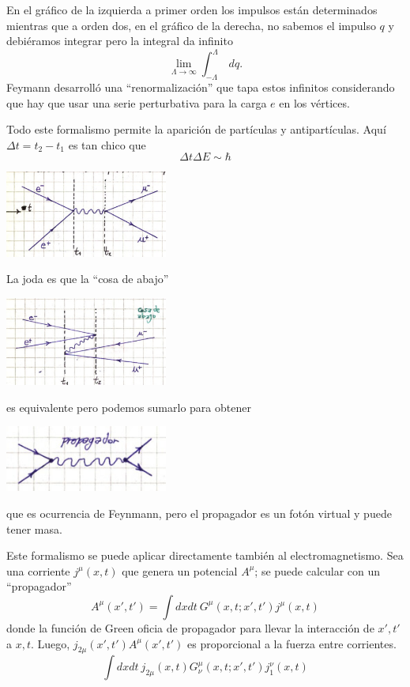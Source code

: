 \documentclass[10pt,oneside]{CBFT_book}
\begin{document}
En el gráfico de la izquierda a primer orden los impulsos están determinados mientras que a orden
dos, en el gráfico de la derecha, no sabemos el impulso $q$ y debiéramos integrar pero la integral
da infinito
\[
	\lim_{\Lambda \to \infty} \int_{-\Lambda}^\Lambda \: dq.
\]
Feymann desarrolló una ``renormalización'' que tapa estos infinitos considerando que hay que usar
una serie perturbativa para la carga $e$ en los vértices.

Todo este formalismo permite la aparición de partículas y antipartículas. Aquí $\Delta t = t_2 - t_1$ es
tan chico que 
\[
	\Delta t \Delta E \sim \hbar
\]

\includegraphics[width=0.4\textwidth]{images/fig_ft2_desdoblamiento_1a.jpg}

La joda es que la ``cosa de abajo'' 

\includegraphics[width=0.4\textwidth]{images/fig_ft2_desdoblamiento_1b.jpg}

es equivalente pero podemos sumarlo para obtener

\includegraphics[width=0.4\textwidth]{images/fig_ft2_desdoblamiento_2a.jpg}

que es ocurrencia de Feynmann, pero el propagador es un fotón virtual y puede tener masa.

Este formalismo se puede aplicar directamente también al electromagnetismo. Sea una corriente $j^\mu(x,t)$
que genera un potencial $A^\mu$; se puede calcular con un ``propagador''
\[
	A^\mu(x',t') = \int dx dt \: G^\mu(x,t ; x', t') j^\mu(x,t)
\]
donde la función de Green oficia de propagador para llevar la interacción de $x',t'$ a $x,t$.
Luego, $j_{2\mu}(x',t') A^\mu(x',t')$ es proporcional a la fuerza entre corrientes.
\[
	\int dx dt \: j_{2\mu}(x,t) G^\mu_\nu(x,t ; x', t') j^\nu_1(x,t)
\]
\end{document}
